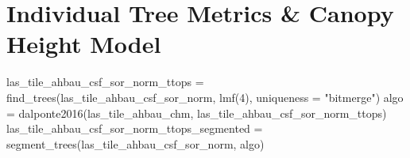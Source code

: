 \documentclass[
]{article}
\newenvironment{Shaded}{\begin{snugshade}}{\end{snugshade}}
\newcommand{\AttributeTok}[1]{\textcolor[rgb]{0.77,0.63,0.00}{#1}}
\newcommand{\DecValTok}[1]{\textcolor[rgb]{0.00,0.00,0.81}{#1}}
\newcommand{\FunctionTok}[1]{\textcolor[rgb]{0.00,0.00,0.00}{#1}}
\newcommand{\NormalTok}[1]{#1}
\newcommand{\OtherTok}[1]{\textcolor[rgb]{0.56,0.35,0.01}{#1}}
\newcommand{\StringTok}[1]{\textcolor[rgb]{0.31,0.60,0.02}{#1}}
\begin{document}
\hypertarget{individual-tree-metrics-canopy-height-model}{%
\section{Individual Tree Metrics \& Canopy Height
Model}\label{individual-tree-metrics-canopy-height-model}}

\begin{Shaded}
\begin{Highlighting}[]
\NormalTok{las\_tile\_ahbau\_csf\_sor\_norm\_ttops }\OtherTok{=} \FunctionTok{find\_trees}\NormalTok{(las\_tile\_ahbau\_csf\_sor\_norm, }\FunctionTok{lmf}\NormalTok{(}\DecValTok{4}\NormalTok{), }\AttributeTok{uniqueness =} \StringTok{"bitmerge"}\NormalTok{)}
\NormalTok{algo }\OtherTok{=} \FunctionTok{dalponte2016}\NormalTok{(las\_tile\_ahbau\_chm, las\_tile\_ahbau\_csf\_sor\_norm\_ttops)}
\NormalTok{las\_tile\_ahbau\_csf\_sor\_norm\_ttops\_segmented }\OtherTok{=} \FunctionTok{segment\_trees}\NormalTok{(las\_tile\_ahbau\_csf\_sor\_norm, algo)}



\end{Highlighting}
\end{Shaded}
\end{document}
